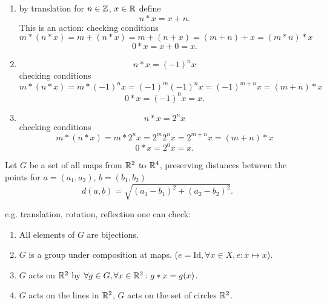 \documentclass[10pt, a4paper]{article}
\begin{document}
\begin{example}[$\Z$ acts on $\R$]
    \begin{enumerate}[label = (\alph*)]
        \item by translation for $n \in \mathbb{Z}$,
        $x \in \mathbb{R}$ define
        \[
        n * x = x + n.
        \]
        This is an action:
        checking conditions
        \[
        m * (n * x) = m + (n * x) = m + (n + x) = (m + n) + x = (m * n) * x
        \]
        \[
        0 * x = x + 0 = x.
        \]

        \item
        \[
        n * x = (-1) ^ nx
        \]
        checking conditions
        \[
        m * (n * x) = m * (-1) ^ nx = (-1) ^ m(-1) ^ nx = (-1) ^ {m + n}x = (m + n) * x
        \]
        \[
        0 * x = (-1) ^ 0x = x.
        \]

        \item
        \[
        n * x = 2 ^ nx
        \]
        checking conditions
        \[
        m * (n * x) = m * 2 ^ nx = 2 ^ m2 ^ nx = 2 ^ {m + n}x = (m + n) * x
        \]
        \[
        0 * x = 2 ^ 0x = x.
        \]
    \end{enumerate}
\end{example}

\begin{example}
    Let $G$ be a set of all maps from $\mathbb{R} ^ 2$ to $\mathbb{R} ^ 4$,
    preserving distances between the points
    for $a = (a_1, a_2)$,
    $b = (b_1, b_2)$
    \[
    d(a, b) = \sqrt{(a_1 - b_1) ^ 2 + (a_2 - b_2) ^ 2}.
    \]
\end{example}
e.g.
translation,
rotation,
reflection one can check:
\begin{enumerate}[label = (\alph*)]
    \item All elements of $G$ are bijections.

    \item $G$ is a group under composition at maps.
    ($e = \mathrm{Id}, \forall x \in X, e : x \mapsto x$).

    \item $G$ acts on $\mathbb{R} ^ 2$ by $\forall g \in G, \forall x \in \mathbb{R} ^ 2: g * x = g(x)$.

    \item $G$ acts on the lines in $\mathbb{R} ^ 2$,
    $G$ acts on the set of circles $\mathbb{R} ^ 2$.
\end{enumerate}
\end{document}
